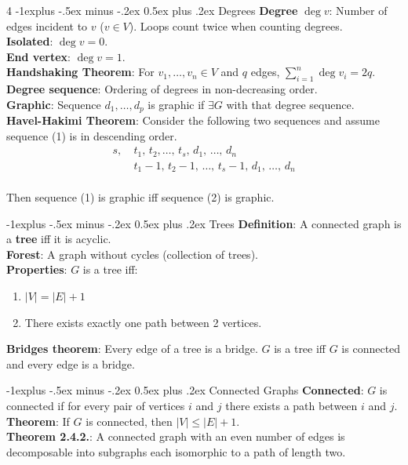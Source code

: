 \documentclass[letterpaper, 8pt]{extarticle}
\makeatletter
\renewcommand{\section}{\@startsection{section}{1}{0mm}%
	{-1explus -.5ex minus -.2ex}%
	{0.5ex plus .2ex}%
	{\normalfont\normalsize\bfseries}}
\makeatother
\begin{document}
\begin{multicols*}{4}
	\section{Degrees}
	\textbf{Degree} $\deg v$: Number of edges incident to $v$ ($v \in V$). Loops count twice when counting degrees. \\
	\textbf{Isolated}: $\deg v = 0$. \\
	\textbf{End vertex}: $\deg v = 1$. \\
	\textbf{Handshaking Theorem}: For $v_1, \dots, v_n \in V$ and $q$ edges, $\sum_{i=1}^n \deg v_i = 2q$. \\
	\textbf{Degree sequence}: Ordering of degrees in non-decreasing order. \\
	\textbf{Graphic}: Sequence $d_1, \dots, d_p$ is graphic if $\exists G$ with that degree sequence. \\
	\textbf{Havel-Hakimi Theorem}: Consider the following two sequences and assume sequence (1) is in descending order.
	\vspace{-8pt}
	\begin{align}
		s,\  & t_1,\, t_2, \ldots,\, t_s,\, d_1,\, \ldots,\, d_n         \\
		     & t_1-1,\, t_2-1,\, \ldots,\, t_s-1,\, d_1,\, \ldots,\, d_n
	\end{align}
	\vspace{-12pt} \\
	Then sequence (1) is graphic iff sequence (2) is graphic.

	\section{Trees}
	\textbf{Definition}: A connected graph is a \textbf{tree} iff it is acyclic. \\
	\textbf{Forest}: A graph without cycles (collection of trees). \\
	\textbf{Properties}: $G$ is a tree iff:
	\begin{enumerate}
		\item $|V| = |E| + 1$
		\item There exists exactly one path between 2 vertices.
	\end{enumerate}
	\textbf{Bridges theorem}: Every edge of a tree is a bridge. $G$ is a tree iff $G$ is connected and every edge is a bridge.

	\section{Connected Graphs}
	\textbf{Connected}: $G$ is connected if for every pair of vertices $i$ and $j$ there exists a path between $i$ and $j$. \\
	\textbf{Theorem}: If $G$ is connected, then $|V| \le |E| + 1$. \\
	\textbf{Theorem 2.4.2.}: A connected graph with an even number of edges is decomposable into subgraphs each isomorphic to a path of length two.


\end{multicols*}
\end{document}
